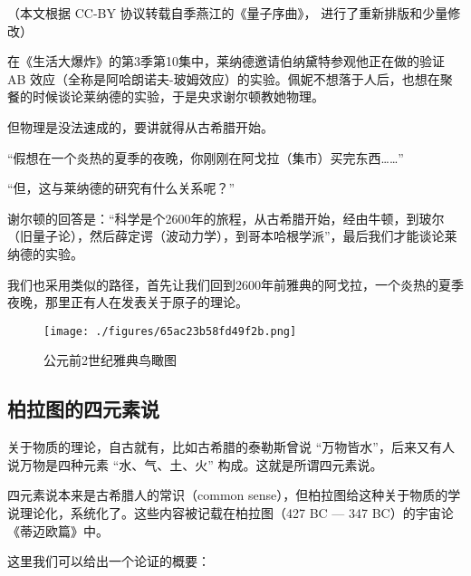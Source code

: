 
（本文根据 CC-BY 协议转载自季燕江的《量子序曲》， 进行了重新排版和少量修改）

在《生活大爆炸》的第3季第10集中，莱纳德邀请伯纳黛特参观他正在做的验证 AB 效应（全称是阿哈朗诺夫-玻姆效应）的实验。佩妮不想落于人后，也想在聚餐的时候谈论莱纳德的实验，于是央求谢尔顿教她物理。

但物理是没法速成的，要讲就得从古希腊开始。

“假想在一个炎热的夏季的夜晚，你刚刚在阿戈拉（集市）买完东西……”

“但，这与莱纳德的研究有什么关系呢？”

谢尔顿的回答是：“科学是个2600年的旅程，从古希腊开始，经由牛顿，到玻尔（旧量子论），然后薛定谔（波动力学），到哥本哈根学派”，最后我们才能谈论莱纳德的实验。

我们也采用类似的路径，首先让我们回到2600年前雅典的阿戈拉，一个炎热的夏季夜晚，那里正有人在发表关于原子的理论。

\begin{figure}[ht]
\centering
\texttt{[image: ./figures/65ac23b58fd49f2b.png]}
\caption{公元前2世纪雅典鸟瞰图} \label{fig_AtomId_1}
\end{figure}

\subsection{柏拉图的四元素说}

关于物质的理论，自古就有，比如古希腊的泰勒斯曾说 “万物皆水”，后来又有人说万物是四种元素 “水、气、土、火” 构成。这就是所谓四元素说。

四元素说本来是古希腊人的常识（common sense），但柏拉图给这种关于物质的学说理论化，系统化了。这些内容被记载在柏拉图（427 BC — 347 BC）的宇宙论《蒂迈欧篇》中。

这里我们可以给出一个论证的概要：

